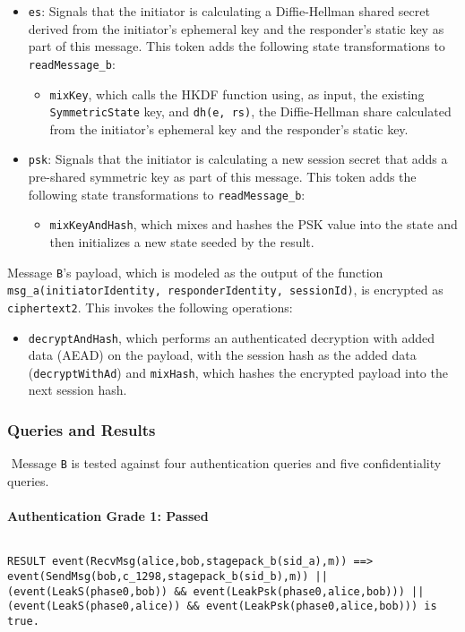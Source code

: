 \begin{itemize}
\item \texttt{es}: Signals that the initiator is calculating a Diffie-Hellman shared secret derived from the initiator's ephemeral key and the responder's static key as part of this message. This token adds the following state transformations to \texttt{readMessage\_b}:
\begin{itemize}

\item \texttt{mixKey}, which calls the HKDF function using, as input, the existing \texttt{SymmetricState} key, and \texttt{dh(e, rs)}, the Diffie-Hellman share calculated from the initiator's ephemeral key and the responder's static key.
\end{itemize}


\item \texttt{psk}: Signals that the initiator is calculating a new session secret that adds a pre-shared symmetric key as part of this message. This token adds the following state transformations to \texttt{readMessage\_b}:
\begin{itemize}

\item  \texttt{mixKeyAndHash}, which mixes and hashes the PSK value into the state and then initializes a new state seeded by the result.
\end{itemize}


\end{itemize}
Message \texttt{B}'s payload, which is modeled as the output of the function \texttt{msg\_a(initiatorIdentity, responderIdentity, sessionId)}, is encrypted as \texttt{ciphertext2}. This invokes the following operations:


\begin{itemize}

\item \texttt{decryptAndHash}, which performs an authenticated decryption with added data (AEAD) on the payload, with the session hash as the added data (\texttt{decryptWithAd}) and \texttt{mixHash}, which hashes the encrypted payload into the next session hash.

\end{itemize}
\subsubsection{Queries and Results}$ $
Message \texttt{B} is tested against four authentication queries and five confidentiality queries.
\paragraph{Authentication Grade 1: Passed}$ $
\begin{lstlisting}
RESULT event(RecvMsg(alice,bob,stagepack_b(sid_a),m)) ==> event(SendMsg(bob,c_1298,stagepack_b(sid_b),m)) || (event(LeakS(phase0,bob)) && event(LeakPsk(phase0,alice,bob))) || (event(LeakS(phase0,alice)) && event(LeakPsk(phase0,alice,bob))) is true.
\end{lstlisting}

